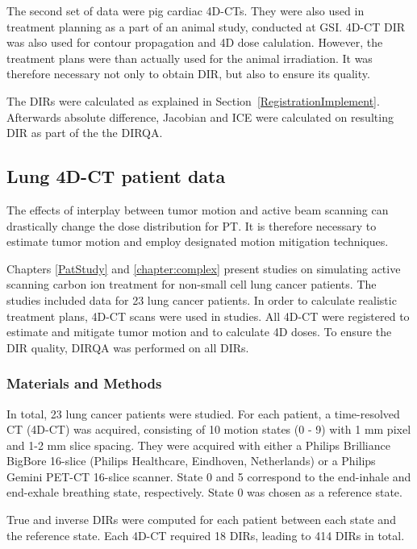 The second set of data were pig cardiac 4D-CTs. They were also used in treatment planning as a part of an animal study, conducted at GSI. 
4D-CT DIR was also used for contour propagation and 4D dose calulation. However, the treatment plans were than actually used for the animal irradiation. It was therefore necessary not only to obtain DIR, but also to ensure its quality.

The DIRs were calculated as explained in Section~\ref{RegistrationImplement}. Afterwards absolute difference, Jacobian and ICE were calculated on resulting DIR as part of the the DIRQA. 

\subsection{Lung 4D-CT patient data}
\label{lungDIR}

The effects of interplay between tumor motion and active beam scanning can drastically change the dose distribution for PT. It is therefore necessary to estimate tumor motion and employ designated motion mitigation techniques.

Chapters \ref{PatStudy} and \ref{chapter:complex} present studies on simulating active scanning carbon ion treatment for non-small cell lung cancer patients.
The studies included data for 23 lung cancer patients. In order to calculate realistic treatment plans, 4D-CT scans were used in studies. 
All 4D-CT were registered to estimate and mitigate tumor motion and to calculate 4D doses. To ensure the DIR quality, DIRQA was performed on all DIRs.

\subsubsection{Materials and Methods}

In total, 23 lung cancer patients were studied. For each patient, a time-resolved CT (4D-CT) was acquired, consisting of 10 motion states (0 - 9) with 1 mm pixel and 1-2 mm slice spacing. 
They were acquired with either a Philips Brilliance BigBore 16-slice 
(Philips Healthcare, Eindhoven, Netherlands) or a Philips Gemini PET-CT 16-slice scanner. 
State 0 and 5 correspond to the end-inhale and end-exhale breathing state, respectively. State 0 was chosen as a reference state. 

True and inverse DIRs were computed for each patient between each state and the reference state. Each 4D-CT required 18 DIRs, leading to 414 DIRs in total.

